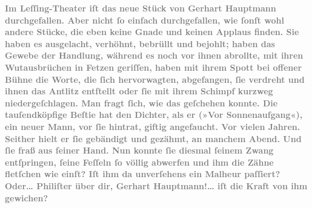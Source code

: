\pstart
           \textcolor{gray}{\textbf{Im Leſſing-Theater iſt das
                  neue Stück von Gerhart Hauptmann durchgefallen. Aber nicht{ }ſo einfach durchgefallen, wie{ }ſonſt wohl andere Stücke, die eben keine Gnade und
                  keinen Applaus finden. Sie haben es ausgelacht, verhöhnt, bebrüllt und bejohlt;
                  haben das Gewebe der Handlung, während es noch vor ihnen abrollte, mit ihren
                  Wutausbrüchen in Fetzen geriſſen, haben mit ihrem Spott bei offener Bühne die
                  Worte, die{ }ſich hervorwagten, abgefangen,{ }ſie verdreht und ihnen das Antlitz
                  entſtellt oder{ }ſie mit ihrem Schimpf kurzweg niedergeſchlagen. Man fragt{ }ſich, wie
                  das geſchehen konnte. Die tauſendköpfige Beſtie hat den Dichter, als er (»Vor Sonnenaufgang«), ein neuer Mann, vor{ }ſie
                  hintrat, giftig angefaucht. Vor vielen Jahren. Seither hielt er{ }ſie gebändigt und
                  gezähmt, an manchem Abend. Und{ }ſie fraß aus{ }ſeiner Hand. Nun konnte{ }ſie diesmal{ }ſeinem Zwang entſpringen,{ }ſeine Feſſeln{ }ſo völlig abwerfen und ihm die Zähne
                  fletſchen wie einſt? Iſt ihm da unverſehens ein Malheur paſſiert? Oder{\dots} Philiſter über dir, Gerhart Hauptmann!{\dots} iſt die Kraft von ihm
                  gewichen?}}\pend
           {\vspace{1\baselineskip}}
\pstart
